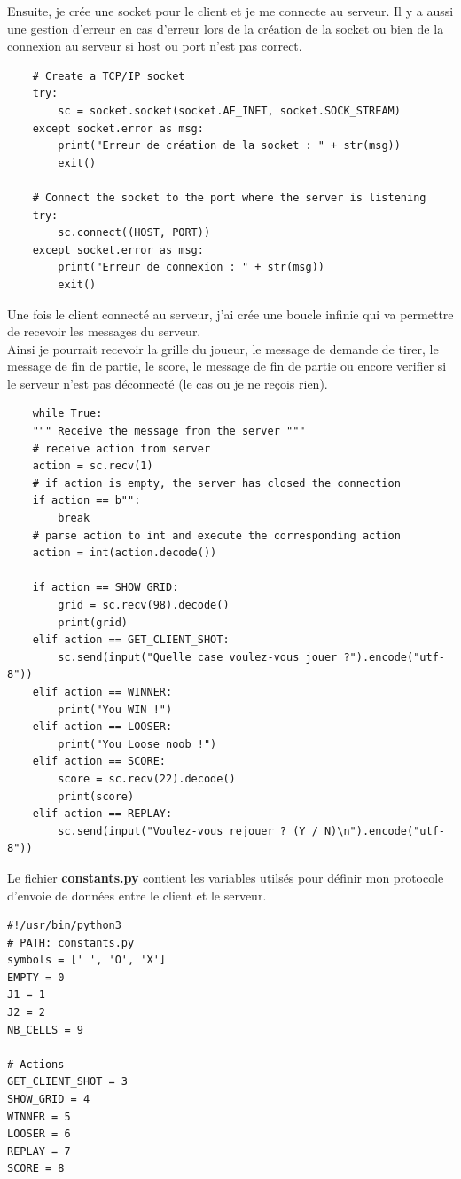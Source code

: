 \documentclass{article}
\begin{document}
Ensuite, je crée une socket pour le client et je me connecte au serveur. Il y a aussi une gestion d'erreur en cas d'erreur lors de la création de la socket ou bien de la connexion au serveur si host ou port n'est pas correct.\\
\begin{lstlisting}
    # Create a TCP/IP socket
    try:
        sc = socket.socket(socket.AF_INET, socket.SOCK_STREAM)
    except socket.error as msg:
        print("Erreur de création de la socket : " + str(msg))
        exit()
    
    # Connect the socket to the port where the server is listening
    try:
        sc.connect((HOST, PORT))
    except socket.error as msg:
        print("Erreur de connexion : " + str(msg))
        exit()
\end{lstlisting}
Une fois le client connecté au serveur, j'ai crée une boucle infinie qui va permettre de recevoir les messages du serveur.\\
Ainsi je pourrait recevoir la grille du joueur, le message de demande de tirer, le message de fin de partie, le score, le message de fin de partie ou encore verifier si le serveur n'est pas déconnecté (le cas ou je ne reçois rien).\\
\begin{lstlisting}
    while True:
    """ Receive the message from the server """
    # receive action from server
    action = sc.recv(1)
    # if action is empty, the server has closed the connection
    if action == b"":
        break
    # parse action to int and execute the corresponding action
    action = int(action.decode())

    if action == SHOW_GRID:
        grid = sc.recv(98).decode()
        print(grid)
    elif action == GET_CLIENT_SHOT:
        sc.send(input("Quelle case voulez-vous jouer ?").encode("utf-8"))
    elif action == WINNER:
        print("You WIN !")
    elif action == LOOSER:
        print("You Loose noob !")
    elif action == SCORE:
        score = sc.recv(22).decode()
        print(score)
    elif action == REPLAY:
        sc.send(input("Voulez-vous rejouer ? (Y / N)\n").encode("utf-8"))
\end{lstlisting}
Le fichier \textbf{constants.py} contient les variables utilsés pour définir mon protocole d'envoie de données entre le client et le serveur.\\
\begin{lstlisting}
#!/usr/bin/python3
# PATH: constants.py
symbols = [' ', 'O', 'X']
EMPTY = 0
J1 = 1
J2 = 2
NB_CELLS = 9

# Actions
GET_CLIENT_SHOT = 3
SHOW_GRID = 4
WINNER = 5
LOOSER = 6
REPLAY = 7
SCORE = 8
\end{lstlisting}
\end{document}
